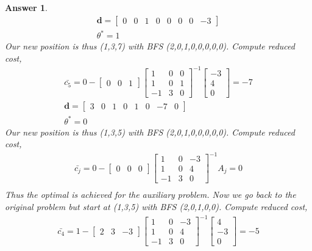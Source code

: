 \documentclass[12pt]{article}
\theoremstyle{colon}
\newtheorem*{answer}{Answer}
\begin{document}
\begin{answer}
\begin{gather*}
    \textbf{d} = \begin{bmatrix} 0 & 0 & 1 & 0 & 0 & 0 & 0 & -3 \end{bmatrix} \\
    \theta^* = 1
  \end{gather*}
  Our new position is thus (1,3,7) with BFS (2,0,1,0,0,0,0,0). Compute reduced cost,
  \begin{gather*}
    \bar{c_5} = 0 - \begin{bmatrix} 0 & 0 & 1 \end{bmatrix}\begin{bmatrix}
      1 & 0 & 0 \\
      1 & 0 & 1 \\
      -1 & 3 & 0
    \end{bmatrix}^{-1} \begin{bmatrix} -3 \\ 4 \\ 0 \end{bmatrix} = -7 \\
    \textbf{d} = \begin{bmatrix} 3 & 0 & 1 & 0 & 1 & 0 & -7 & 0 \end{bmatrix} \\
    \theta^* = 0
  \end{gather*}
  Our new position is thus (1,3,5) with BFS (2,0,1,0,0,0,0,0). Compute reduced cost,
  \begin{gather*}
    \bar{c_j} = 0 - \begin{bmatrix} 0 & 0 & 0 \end{bmatrix}\begin{bmatrix}
      1 & 0 & -3 \\
      1 & 0 & 4 \\
      -1 & 3 & 0
    \end{bmatrix}^{-1} A_j = 0 \\
  \end{gather*}
  Thus the optimal is achieved for the auxiliary problem. Now we go back to the original problem but start at (1,3,5) with BFS (2,0,1,0,0). Compute reduced cost,
  \begin{gather*}
    \bar{c_4} = 1 - \begin{bmatrix} 2 & 3 & -3 \end{bmatrix}\begin{bmatrix}
      1 & 0 & -3\\
      1 & 0 & 4 \\
      -1 & 3 & 0
    \end{bmatrix}^{-1} \begin{bmatrix} 4 \\ -3 \\ 0 \end{bmatrix} = -5 \\

\end{gather*}
\end{answer}
\end{document}
